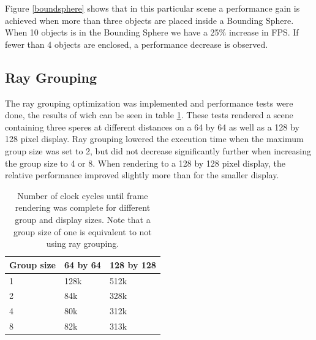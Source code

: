 			Figure \ref{boundsphere} shows that in this particular scene a
			performance gain is achieved when more than three objects are
			placed inside a Bounding Sphere.  When 10 objects is in the
			Bounding Sphere we have a 25\% increase in FPS.  If fewer than 4
			objects are enclosed, a performance decrease is observed. 
		
		\subsection{Ray Grouping}
			
			The ray grouping optimization was implemented and performance tests
			were done, the results of wich can be seen in table
			\ref{grouptable}. These tests rendered a scene containing three
			speres at different distances on a 64 by 64 as well as a 128 by 128
			pixel display. Ray grouping lowered the execution time when the
			maximum group size was set to 2, but did not decrease significantly
			further when increasing the group size to 4 or 8. When rendering to
			a 128 by 128 pixel display, the relative performance improved
			slightly more than for the smaller display.

			\begin{table}[h]
			\centering
			\begin{tabular}{lll}
				\hline
				Group size & 64 by 64 & 128 by 128 \\
				\hline
				1          & 128k     &  512k      \\
				2          & 84k      &  328k      \\
				4          & 80k      &  312k      \\
				8          & 82k      &  313k      \\
				\hline
			\end{tabular}
			\caption{Number of clock cycles until frame rendering was complete
				for different group and display sizes. Note that a group size 
				of one is equivalent to not using ray grouping.}
			\label{grouptable}
			\end{table}
